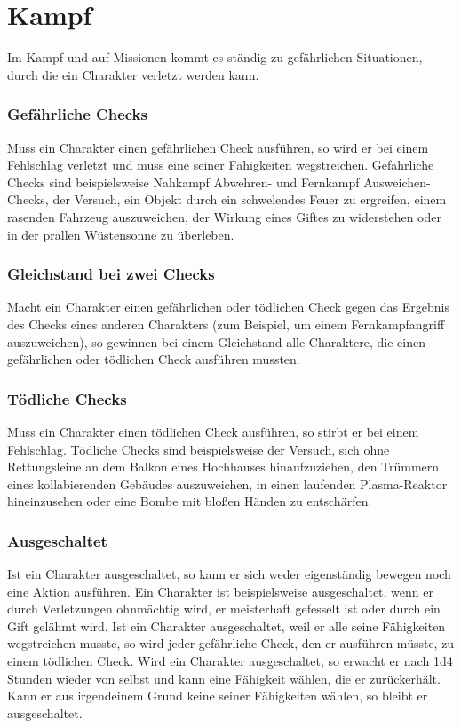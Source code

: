 \section{Kampf}
Im Kampf und auf Missionen kommt es ständig zu gefährlichen Situationen, durch die ein Charakter verletzt werden kann.
\subsubsection{Gefährliche Checks}
Muss ein Charakter einen gefährlichen Check ausführen, so wird er bei einem Fehlschlag verletzt und muss eine seiner Fähigkeiten wegstreichen. Gefährliche Checks sind beispielsweise Nahkampf Abwehren- und Fernkampf Ausweichen-Checks, der Versuch, ein Objekt durch ein schwelendes Feuer zu ergreifen, einem rasenden Fahrzeug auszuweichen, der Wirkung eines Giftes zu widerstehen oder in der prallen Wüstensonne zu überleben.
\subsubsection{Gleichstand bei zwei Checks}
Macht ein Charakter einen gefährlichen oder tödlichen Check gegen das Ergebnis des Checks eines anderen Charakters (zum Beispiel, um einem Fernkampfangriff auszuweichen), so gewinnen bei einem Gleichstand alle Charaktere, die einen gefährlichen oder tödlichen Check ausführen mussten.
\subsubsection{Tödliche Checks}
Muss ein Charakter einen tödlichen Check ausführen, so stirbt er bei einem Fehlschlag. Tödliche Checks sind beispielsweise der Versuch, sich ohne Rettungsleine an dem Balkon eines Hochhauses hinaufzuziehen, den Trümmern eines kollabierenden Gebäudes auszuweichen, in einen laufenden Plasma-Reaktor hineinzusehen oder eine Bombe mit bloßen Händen zu entschärfen.
\subsubsection{Ausgeschaltet}
Ist ein Charakter ausgeschaltet, so kann er sich weder eigenständig bewegen noch eine Aktion ausführen. Ein Charakter ist beispielsweise ausgeschaltet, wenn er durch Verletzungen ohnmächtig wird, er meisterhaft gefesselt ist oder durch ein Gift gelähmt wird. Ist ein Charakter ausgeschaltet, weil er alle seine Fähigkeiten wegstreichen musste, so wird jeder gefährliche Check, den er ausführen müsste, zu einem tödlichen Check. Wird ein Charakter ausgeschaltet, so erwacht er nach 1d4 Stunden wieder von selbst und kann eine Fähigkeit wählen, die er zurückerhält. Kann er aus irgendeinem Grund keine seiner Fähigkeiten wählen, so bleibt er ausgeschaltet.
